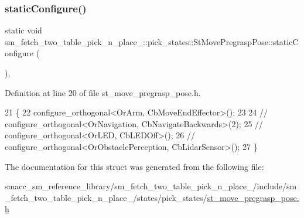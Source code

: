 \subsubsection{\texorpdfstring{static\+Configure()}{staticConfigure()}}
{\footnotesize\ttfamily static void sm\+\_\+fetch\+\_\+two\+\_\+table\+\_\+pick\+\_\+n\+\_\+place\+\_\+::pick\+\_\+states\+::\+St\+Move\+Pregrasp\+Pose\+::static\+Configure (\begin{DoxyParamCaption}{ }\end{DoxyParamCaption})\hspace{0.3cm}{\ttfamily [inline]}, {\ttfamily [static]}}



Definition at line 20 of file st\+\_\+move\+\_\+pregrasp\+\_\+pose.\+h.


\begin{DoxyCode}
21     \{
22         configure\_orthogonal<OrArm, CbMoveEndEffector>();
23 
24         \textcolor{comment}{//   configure\_orthogonal<OrNavigation, CbNavigateBackwards>(2);}
25         \textcolor{comment}{//   configure\_orthogonal<OrLED, CbLEDOff>();}
26         \textcolor{comment}{//   configure\_orthogonal<OrObstaclePerception, CbLidarSensor>();}
27     \}
\end{DoxyCode}


The documentation for this struct was generated from the following file\+:\begin{DoxyCompactItemize}
\item 
smacc\+\_\+sm\+\_\+reference\+\_\+library/sm\+\_\+fetch\+\_\+two\+\_\+table\+\_\+pick\+\_\+n\+\_\+place\+\_/include/sm\+\_\+fetch\+\_\+two\+\_\+table\+\_\+pick\+\_\+n\+\_\+place\+\_/states/pick\+\_\+states/\hyperlink{sm__fetch__two__table__pick__n__place__1_2include_2sm__fetch__two__table__pick__n__place__1_2sta7ee52fc4fdbbf0412f82fca75c406c9c}{st\+\_\+move\+\_\+pregrasp\+\_\+pose.\+h}\end{DoxyCompactItemize}
